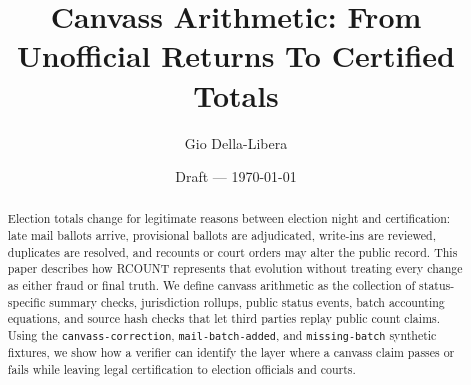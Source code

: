 \documentclass[12pt]{article}
\title{Canvass Arithmetic: From Unofficial Returns To Certified Totals}
\author{Gio Della-Libera}
\date{Draft --- \today}
\begin{document}
\maketitle

\begin{abstract}
Election totals change for legitimate reasons between election night and
certification: late mail ballots arrive, provisional ballots are adjudicated,
write-ins are reviewed, duplicates are resolved, and recounts or court orders
may alter the public record. This paper describes how RCOUNT represents that
evolution without treating every change as either fraud or final truth. We
define canvass arithmetic as the collection of status-specific summary checks,
jurisdiction rollups, public status events, batch accounting equations, and
source hash checks that let third parties replay public count claims. Using the
\texttt{canvass-correction}, \texttt{mail-batch-added}, and
\texttt{missing-batch} synthetic fixtures, we show how a verifier can identify
the layer where a canvass claim passes or fails while leaving legal
certification to election officials and courts.
\end{abstract}










\nocite{rcount-overview-2026,rcount-substrate-2026}


\end{document}
